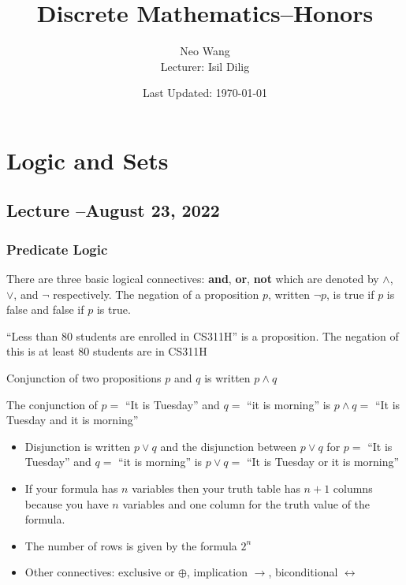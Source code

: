 \documentclass[8pt]{scrreprt}
\title{Discrete Mathematics--Honors}
\author{Neo Wang\\ Lecturer: Isil Dilig}
\date{Last Updated: \today}
\begin{document}
\maketitle
\tableofcontents

\chapter{Logic and Sets}

\section{Lecture --August 23, 2022}
\subsection{Predicate Logic}

There are three basic logical connectives: \textbf{and}, \textbf{or}, \textbf{not}
which are denoted by $\land$, $\lor$, and $\neg$ respectively.
The negation of a proposition $p$, written $\neg p$, is true if $p$ is false and false if $p$ is true.

\begin{example}
	``Less than 80 students are enrolled in CS311H'' is a proposition. The negation of this is at least $80$ students are in CS311H
\end{example}

Conjunction of two propositions $p$ and $q$ is written $p\land q$

\begin{example}
	The conjunction of $p=$ ``It is Tuesday'' and $q=$ ``it is morning'' is $p\land q=$ ``It is Tuesday and it is morning''
\end{example}

\begin{itemize}
	\item Disjunction is written $p\lor q$ and the disjunction between $p\lor q$ for $p=$ ``It is Tuesday'' and $q=$ ``it is morning'' is $p\lor q=$ ``It is Tuesday or it is morning''
	\item If your formula has $n$ variables then your truth table has $n+1$ columns because you have $n$ variables and one column for the truth value of the formula.
	\item The number of rows is given by the formula $2^n$
	\item Other connectives: exclusive or $\oplus$, implication $\rightarrow$, biconditional $\leftrightarrow$
\end{itemize}
\end{document}
